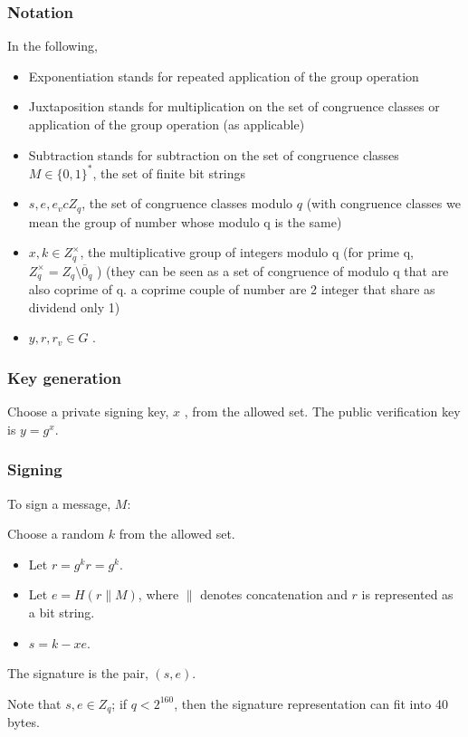 \documentclass{article}
\begin{document}
\subsubsection{Notation}
In the following,
\begin{itemize}
    \item Exponentiation stands for repeated application of the group operation
    \item Juxtaposition stands for multiplication on the set of congruence classes or application of the group operation (as applicable)
    \item Subtraction stands for subtraction on the set of congruence classes ${ M\in \{0,1\}^{*}}$, the set of finite bit strings
    \item $s,e,e_{v} c {Z} _{q}$, the set of congruence classes modulo ${ q}$ (with congruence classes we mean the group of number whose modulo q is the same)
    \item ${ x,k\in {Z} _{q}^{\times}}$, the multiplicative group of integers modulo q (for prime  q,  ${Z}_{q}^{\times}={Z}_{q} \setminus {\overline {0}}_{q}$ ) (they can be seen as a set of congruence of modulo q that are also coprime of q. a coprime couple of number are 2 integer that share as dividend only 1)
    \item ${ y,r,r_{v}\in G}$ .

\end{itemize}
\subsubsection{Key generation}
Choose a private signing key, ${ x}$ , from the allowed set.
The public verification key is ${ y=g^{x}}$.
\subsubsection{Signing}
To sign a message, ${ M}$:

Choose a random ${ k}$ from the allowed set.
\begin{itemize}
    \item Let ${ r=g^{k}}r=g^{k}$.
    \item Let ${ e=H(r\parallel M)}$, where ${ \parallel }$  denotes concatenation and ${ r}$ is represented as a bit string.
    \item ${ s=k-xe}$.
\end{itemize}
The signature is the pair, ${ (s,e)}$.

Note that ${ s,e\in {Z} _{q}}$; if ${ q<2^{160}}$, then the signature representation can fit into 40 bytes.
\end{document}
